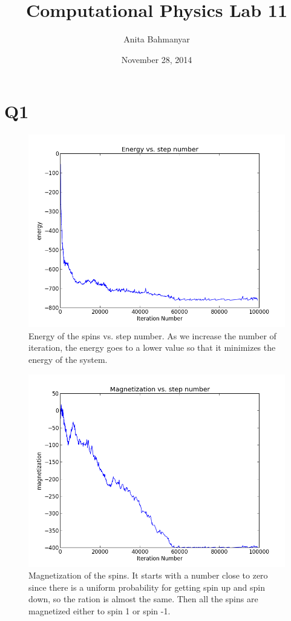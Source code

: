 \documentclass[letterpaper,12pt]{article}
\title{Computational Physics Lab 11}
\author{Anita Bahmanyar}
\affil{\small {Student Number: 998909098}}
\date{November 28, 2014}
\begin{document}
\maketitle

\section*{Q1}

\FloatBarrier
\begin{figure}[H]
\centering
\includegraphics[scale=0.55]{q1_energy.png}
\caption{Energy of the spins vs. step number. As we increase the number of iteration, the energy goes to a lower value so that it minimizes the energy of the system.}
\end{figure}
\FloatBarrier

\FloatBarrier
\begin{figure}[H]
\centering
\includegraphics[scale=0.55]{q1_magnetization.png}
\caption{Magnetization of the spins. It starts with a number close to zero since there is a uniform probability for getting spin up and spin down, so the ration is almost the same. Then all the spins are magnetized either to spin 1 or spin -1.}
\end{figure}
\FloatBarrier
\end{document}
